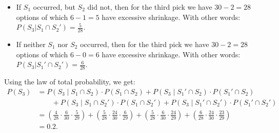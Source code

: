 {\begin{enumerate}[label=(\alph*)]
\begin{itemize}
            With other words: $P(S_3 | S_1' \cap S_2) = \frac{5}{28}$.
            \item If $S_1$ occurred, but $S_2$ did not, then for the third pick we have $30-2=28$ options of which $6-1=5$ have excessive shrinkage.
            With other words: $P(S_3 | S_1 \cap S_2') = \frac{5}{28}$.
            \item If neither $S_1$ nor $S_2$ occurred, then for the third pick we have $30-2=28$ options of which $6-0=6$ have excessive shrinkage.
            With other words: $P(S_3 | S_1' \cap S_2') = \frac{6}{28}$.
        \end{itemize}
        Using the law of total probability, we get:
        \begin{align*}
            P(S_3)  &= P(S_3 \mid S_1 \cap S_2) \cdot P(S_1 \cap S_2) + P(S_3 \mid S_1' \cap S_2) \cdot P(S_1' \cap S_2) \\
            &\qquad+ P(S_3 \mid S_1 \cap S_2') \cdot P(S_1 \cap S_2') + P(S_3 \mid S_1' \cap S_2') \cdot P(S_1' \cap S_2') \\
                    &= \left(\frac{4}{28} \cdot \frac{6}{30} \cdot \frac{5}{29}\right) + \left(\frac{5}{28} \cdot \frac{24}{30} \cdot \frac{6}{29}\right) + \left(\frac{5}{28} \cdot \frac{6}{30} \cdot \frac{24}{29}\right) + \left(\frac{6}{28} \cdot \frac{24}{30} \cdot \frac{23}{29}\right) \\
                    &= 0.2.
        \end{align*}
    \end{enumerate}
}